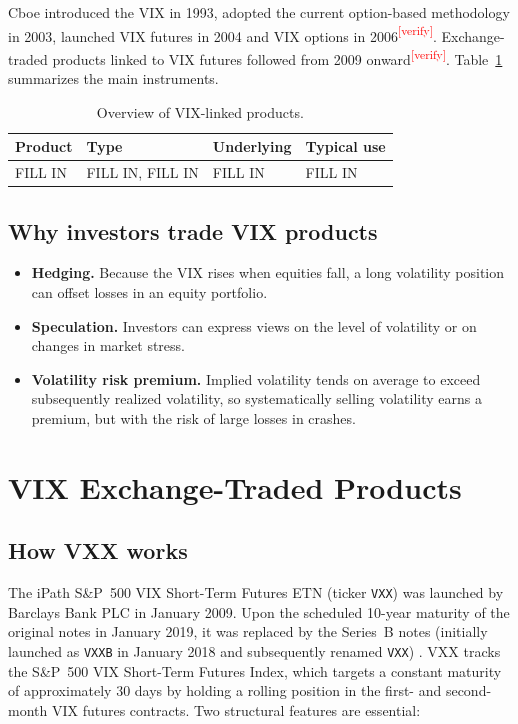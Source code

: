 \documentclass[11pt,a4paper]{article}
\newcommand{\verify}[1][]{\textcolor{red}{\textsuperscript{[verify#1]}}}
\begin{document}
Cboe introduced the VIX in 1993, adopted the current option-based methodology in 2003, launched VIX futures in 2004 and VIX options in 2006\verify. Exchange-traded products linked to VIX futures followed from 2009 onward\verify. Table~\ref{tab:products} summarizes the main instruments.

\begin{table}[H]
\centering
\small
\begin{tabular}{@{}p{3.4cm}p{3.6cm}p{3.6cm}p{4.2cm}@{}}
\toprule
\textbf{Product} & \textbf{Type} & \textbf{Underlying} & \textbf{Typical use}\\
\midrule
FILL IN & FILL IN, FILL IN & FILL IN & FILL IN\\
\bottomrule
\end{tabular}
\caption{Overview of VIX-linked products.}
\label{tab:products}
\end{table}

\subsection{Why investors trade VIX products}

\begin{itemize}
  \item \textbf{Hedging.} Because the VIX rises when equities fall, a long volatility position can offset losses in an equity portfolio.
  \item \textbf{Speculation.} Investors can express views on the level of volatility or on changes in market stress.
  \item \textbf{Volatility risk premium.} Implied volatility tends on average to exceed subsequently realized volatility, so systematically selling volatility earns a premium, but with the risk of large losses in crashes.
\end{itemize}

\section{VIX Exchange-Traded Products}

\subsection{How VXX works}

The iPath S\&P~500 VIX Short-Term Futures ETN (ticker \texttt{VXX}) was launched by Barclays Bank PLC in January 2009. Upon the scheduled 10-year maturity of the original notes in January 2019, it was replaced by the Series~B notes (initially launched as \texttt{VXXB} in January 2018 and subsequently renamed \texttt{VXX}) \cite{vxx}. VXX tracks the S\&P~500 VIX Short-Term Futures Index, which targets a constant maturity of approximately 30 days by holding a rolling position in the first- and second-month VIX futures contracts. Two structural features are essential:
\end{document}
